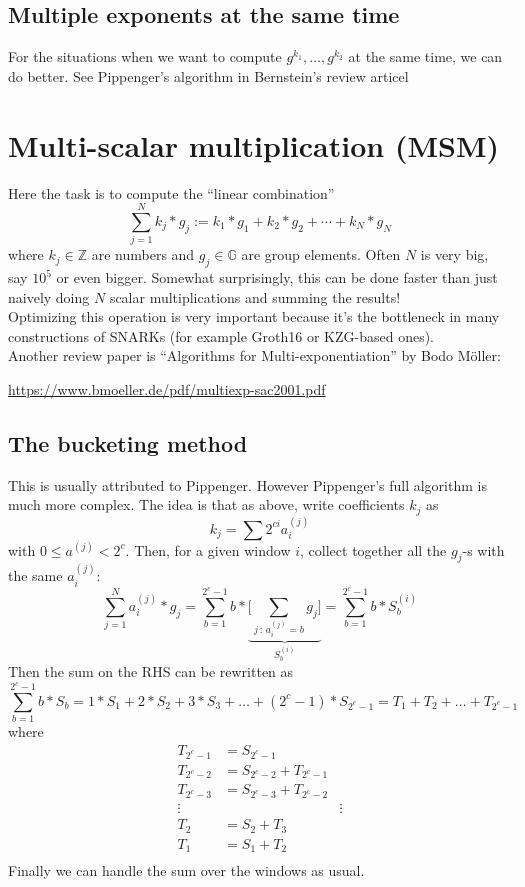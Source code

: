 \documentclass[12pt,draft,a4paper,openany,oneside]{amsbook}
\def\G{\mathbb{G}}
\def\Z{\mathbb{Z}}
\theoremstyle{plain}
\theoremstyle{definition}
\begin{document}

\subsection{Multiple exponents at the same time}
For the situations when we want to compute $g^{k_1},\dots, g^{k_2}$ at the same
time, we can do better. See Pippenger's algorithm in Bernstein's review articel 


\section{Multi-scalar multiplication (MSM)}

Here the task is to compute the ``linear combination''
\[ \sum_{j=1}^N k_j*g_j := k_1 * g_1 + k_2 * g_2 + \cdots + k_N * g_N \]
where $k_j\in\Z$ are numbers and $g_j\in\G$ are group elements.
Often $N$ is very big, say $10^5$ or even bigger.
Somewhat surprisingly, this can be done faster than just naively doing $N$
scalar multiplications and summing the results!\\

Optimizing this operation is very important because it's the bottleneck
in many constructions of SNARKs (for example Groth16 or KZG-based ones).\\

Another review paper is ``Algorithms for Multi-exponentiation'' by Bodo M\"oller:

\noindent
\url{https://www.bmoeller.de/pdf/multiexp-sac2001.pdf}

\subsection{The bucketing method}
This is usually attributed to Pippenger. However Pippenger's full algorithm
is much more complex. 
The idea is that as above, write coefficients $k_j$ as
\[ k_j = \sum 2^{ci} a^{(j)}_i \]
with $0 \le a^{(j)} < 2^c$.
Then, for a given window $i$, collect together all the $g_j$-s with the same
$a^{(j)}_i$:
\[ \sum_{j=1}^N a^{(j)}_i * g_j = \sum_{b=1}^{2^c-1} b * 
\underbrace{ \bigg[\sum_{j\,:\,a^{(j)}_i=b} g_j \bigg]}_{S^{(i)}_b}  = \sum_{b=1}^{2^c-1} b * S^{(i)}_b
\]
Then the sum on the RHS can be rewritten as 
\[ \sum_{b=1}^{2^c-1} b * S_b = 1*S_1 + 2*S_2 + 3*S_3 + \dots + (2^c-1)*S_{2^c-1} =
T_1 + T_2 + \dots + T_{2^c-1} \]
where 
\begin{align*}
T_{2^c-1} &= S_{2^c-1}  \\
T_{2^c-2} &= S_{2^c-2} + T_{2^c-1}  \\
T_{2^c-3} &= S_{2^c-3} + T_{2^c-2}  \\
\vdots & & \vdots \\
T_{2} &= S_{2} + T_{3}  \\
T_{1} &= S_{1} + T_{2}  \\
\end{align*}
Finally we can handle the sum over the windows as usual.\\
\end{document}
